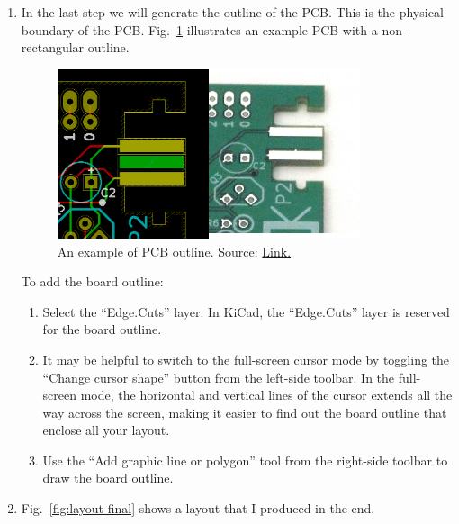\documentclass[12pt,letterpaper]{scrartcl}
\begin{document}
\begin{enumerate}
\begin{enumerate}
		\end{enumerate}
	
	\item In the last step we will generate the outline of the PCB. This is the physical boundary of the PCB. Fig.~\ref{fig:pcb-outline-example} illustrates an example PCB with a non-rectangular outline. 
		\begin{figure}[hp]
				\centering
				\includegraphics[width=3.5in]{pcb-outline-example}
				\caption{An example of PCB outline. Source: \href{https://www.wayneandlayne.com/blog/2013/02/26/kicad-tutorial-pcb-edges/}{Link.}}
				\label{fig:pcb-outline-example}
		\end{figure}
	
	To add the board outline:
		\begin{enumerate}
			\item Select the ``Edge.Cuts'' layer. In KiCad, the ``Edge.Cuts'' layer is reserved for the board outline. 
			
			\item It may be helpful to switch to the full-screen cursor mode by toggling the ``Change cursor shape'' button from the left-side toolbar. In the full-screen mode, the horizontal and vertical lines of the cursor extends all the way across the screen, making it easier to find out the board outline that enclose all your layout. 
			
			\item Use the ``Add graphic line or polygon'' tool from the right-side toolbar to draw the board outline. 
		\end{enumerate}
			
	\item Fig.~\ref{fig:layout-final} shows a layout that I produced in the end. 
	

\end{enumerate}
\end{document}
